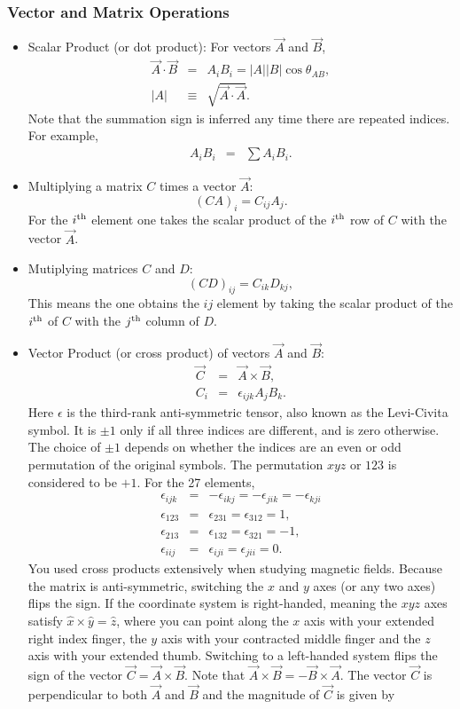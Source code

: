 \subsubsection*{Vector and Matrix Operations}
\begin{itemize}\itemsep=0pt
\item Scalar Product (or dot product): For vectors $\vec{A}$ and $\vec{B}$,
\begin{eqnarray*}
\vec{A}\cdot\vec{B}&=&A_iB_i=|A||B|\cos\theta_{AB},\\
|A|&\equiv& \sqrt{\vec{A}\cdot\vec{A}}.
\end{eqnarray*}
Note that the summation sign is inferred any time there are repeated indices. For example, 
\begin{eqnarray}
A_iB_i&=&\sum A_iB_i.
\end{eqnarray}
\item Multiplying a matrix $C$ times a vector $\vec{A}$:
\[
(CA)_i=C_{ij}A_j.
\]
For the $i^{\rm th}$ element one takes the scalar product of the $i^{\rm th}$ row of $C$ with the vector $\vec{A}$.
\item Mutiplying matrices $C$ and $D$:
\[
(CD)_{ij}=C_{ik}D_{kj},
\]
This means the one obtains the $ij$ element by taking the scalar product of the $i^{\rm th}$ of $C$ with the $j^{\rm th}$ column of $D$.
\item Vector Product (or cross product) of vectors $\vec{A}$ and $\vec{B}$:
\begin{eqnarray*}
\vec{C}&=&\vec{A}\times\vec{B},\\
C_i&=&\epsilon_{ijk}A_jB_k.
\end{eqnarray*}
Here $\epsilon$ is the third-rank anti-symmetric tensor, also known as the Levi-Civita symbol. It is $\pm 1$ only if all three indices are different, and is zero otherwise. The choice of $\pm 1$ depends on whether the indices are an even or odd permutation of the original symbols. The permutation $xyz$ or $123$ is considered to be $+1$. For the 27 elements,
\begin{eqnarray}
\epsilon_{ijk}&=&-\epsilon_{ikj}=-\epsilon_{jik}=-\epsilon_{kji}\\
\nonumber
\epsilon_{123}&=&\epsilon_{231}=\epsilon_{312}=1,\\
\nonumber
\epsilon_{213}&=&\epsilon_{132}=\epsilon_{321}=-1,\\
\nonumber
\epsilon_{iij}&=&\epsilon_{iji}=\epsilon_{jii}=0.
\end{eqnarray}
You used cross products extensively when studying magnetic fields. Because the matrix is anti-symmetric, switching the $x$ and $y$ axes (or any two axes) flips the sign. If the coordinate system is right-handed, meaning the $xyz$ axes satisfy $\hat{x}\times\hat{y}=\hat{z}$, where you can point along the $x$ axis with your extended right index finger, the $y$ axis with your contracted middle finger and the $z$ axis with your extended thumb. Switching to a left-handed system flips the sign of the vector $\vec{C}=\vec{A}\times\vec{B}$. Note that $\vec{A}\times\vec{B}=-\vec{B}\times\vec{A}$. The vector $\vec{C}$ is perpendicular to both $\vec{A}$ and $\vec{B}$ and the magnitude of $\vec{C}$ is given by 

\end{itemize}
